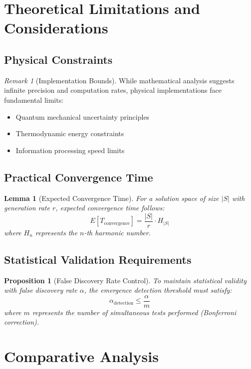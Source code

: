 \documentclass[11pt,a4paper]{article}
\newtheorem{lemma}[theorem]{Lemma}
\newtheorem{proposition}[theorem]{Proposition}
\theoremstyle{remark}
\newtheorem{remark}[theorem]{Remark}
\begin{document}
\section{Theoretical Limitations and Considerations}

\subsection{Physical Constraints}

\begin{remark}[Implementation Bounds]
While mathematical analysis suggests infinite precision and computation rates, physical implementations face fundamental limits:
\begin{itemize}
\item Quantum mechanical uncertainty principles
\item Thermodynamic energy constraints
\item Information processing speed limits
\end{itemize}
\end{remark}

\subsection{Practical Convergence Time}

\begin{lemma}[Expected Convergence Time]
For a solution space of size $|S|$ with generation rate $r$, expected convergence time follows:
$$E[T_{\text{convergence}}] = \frac{|S|}{r} \cdot H_{|S|}$$
where $H_n$ represents the $n$-th harmonic number.
\end{lemma}

\subsection{Statistical Validation Requirements}

\begin{proposition}[False Discovery Rate Control]
To maintain statistical validity with false discovery rate $\alpha$, the emergence detection threshold must satisfy:
$$\alpha_{\text{detection}} \leq \frac{\alpha}{m}$$
where $m$ represents the number of simultaneous tests performed (Bonferroni correction).
\end{proposition}

\section{Comparative Analysis}
\end{document}
